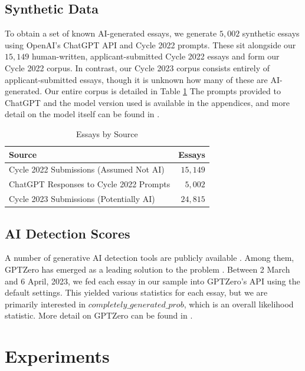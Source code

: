 \subsection{Synthetic Data}\label{ssec:chatgpt}
To obtain a set of known AI-generated essays, we generate $5,002$ synthetic essays using OpenAI's ChatGPT API and Cycle 2022 prompts. These sit alongside our $15,149$ human-written, applicant-submitted Cycle 2022 essays and form our Cycle 2022 corpus. In contrast, our Cycle 2023 corpus consists entirely of applicant-submitted essays, though it is unknown how many of these are AI-generated. Our entire corpus is detailed in Table \ref{tab:cycle_counts} The prompts provided to ChatGPT and the model version used is available in the appendices, and more detail on the model itself can be found in \cite{brown_language_2020}.

\begin{table}[tbh]
    \centering
    \caption{Essays by Source}
    \label{tab:cycle_counts}
    \begin{tabular}{ l r }
        \toprule
        Source  & Essays \\
        \midrule
        Cycle 2022 Submissions (Assumed Not AI) & $15,149$ \\
        ChatGPT Responses to Cycle 2022 Prompts & $5,002$ \\
        Cycle 2023 Submissions (Potentially AI) & $24,815$ \\
        \bottomrule
    \end{tabular}
\end{table}

\subsection{AI Detection Scores}\label{ssec:gptzero}
A number of generative AI detection tools are publicly available \cite{mitchell_detectgpt_2023,gptzero_gptzero_2023}. Among them, GPTZero has emerged as a leading solution to the problem \cite{gptzero_gptzero_2023}. Between 2 March and 6 April, 2023, we fed each essay in our sample into GPTZero's API using the default settings. This yielded various statistics for each essay, but we are primarily interested in $completely\_generated\_prob$, which is an overall likelihood statistic. More detail on GPTZero can be found in \cite{gptzero_gptzero_2023}.

\section{Experiments}
